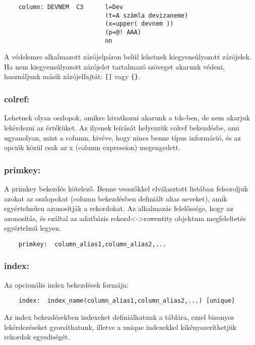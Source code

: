 \begin{verbatim}
    column: DEVNEM  C3      l=Dev
                            (t=A számla devizaneme)
                            (x=upper( devnem ))
                            (p=@! AAA)
                            nn
\end{verbatim}

A védelemre alkalmazott zárójelpáron belül lehetnek kiegyensúlyozott
zárójelek. Ha nem kiegyensúlyozott zárójelet tartalmazó szöveget
akarunk védeni, használjunk másik zárójelfajtát: \verb![]! vagy \verb!{}!.



\subsubsection*{colref:}
    Lehetnek olyan oszlopok, amikre hivatkozni 
    akarunk a tds-ben, de nem akarjuk lekérdezni az értéküket.  
    Az ilyenek leírását helyezzük colref bekezdésbe, ami ugyanolyan, 
    mint a column, kivéve, hogy nincs benne típus információ,
    és az opciók közül csak az x (column expression) megengedett.

    
\subsubsection*{primkey:}

    A primkey bekezdés kötelező. Benne vesszőkkel elválasztott
    listában felsoroljuk azokat az oszlopokat (column bekezdésben
    definiált alias neveket), amik egyértelműen azonosítják a 
    rekordokat. Az alkalmazás felelőssége, hogy az azonosítás,
    és ezáltal az adatbázis rekord<->rowentity objektum megfeleltetés
    egyértelmű legyen.
\begin{verbatim}    
    primkey:  column_alias1,column_alias2,...
\end{verbatim}    
   
    
\subsubsection*{index:}

    Az opcionális index bekezdések formája:
\begin{verbatim}    
    index:  index_name(column_alias1,column_alias2,...) [unique]
\end{verbatim}    
    Az  index bekezdésekben indexeket definiálhatunk
    a táblára, ezzel bizonyos lekérdezéseket gyorsíthatunk,
    illetve a unique indexekkel kikényszeríthetjük rekordok
    egyediségét.

